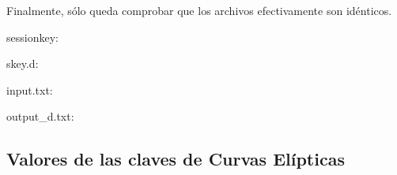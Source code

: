 \documentclass[a4paper, 11pt]{article}
\begin{document}
		Finalmente, sólo queda comprobar que los archivos efectivamente son idénticos.
		
		sessionkey:
		
		
		skey.d:
		
		
		input.txt:
		
		
		output\_d.txt:
		
	
	\subsection{Valores de las claves de Curvas Elípticas}
\end{document}
